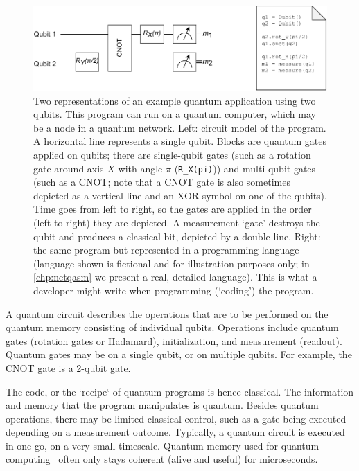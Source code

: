 \begin{figure}[t]
    \centering
    \includegraphics[width=0.8\linewidth]{figures/background/local_circuit.pdf}
    \caption{
        Two representations of an example quantum application using two qubits.
        This program can run on a quantum computer, which may be a node in a quantum network.
        Left: circuit model of the program.
        A horizontal line represents a single qubit.
        Blocks are quantum gates applied on qubits; there are single-qubit gates (such as a rotation gate around axis $X$ with angle $\pi$ (\texttt{R\_X(pi)})) and multi-qubit gates (such as a CNOT; note that a CNOT gate is also sometimes depicted as a vertical line and an XOR symbol on one of the qubits).
        Time goes from left to right, so the gates are applied in the order (left to right) they are depicted.
        A measurement `gate' destroys the qubit and produces a classical bit, depicted by a double line.
        Right: the same program but represented in a programming language (language shown is fictional and for illustration purposes only; in \cref{chp:netqasm} we present a real, detailed language).
        This is what a developer might write when programming (`coding') the program.
    }
    \label{background:fig:local_circuit}
\end{figure}



A quantum circuit describes the operations that are to be performed on the quantum memory consisting of individual qubits.
Operations include quantum gates (rotation gates or Hadamard), initialization, and measurement (readout).
Quantum gates may be on a single qubit, or on multiple qubits.
For example, the CNOT gate is a 2-qubit gate.

The code, or the `recipe` of quantum programs is hence classical.
The information and memory that the program manipulates is quantum.
Besides quantum operations, there may be limited classical control, such as a gate being executed depending on a measurement outcome.
Typically, a quantum circuit is executed in one go, on a very small timescale.
Quantum memory used for quantum computing~\cite{de_leon_materials_2021} often only stays coherent (alive and useful) for microseconds.

